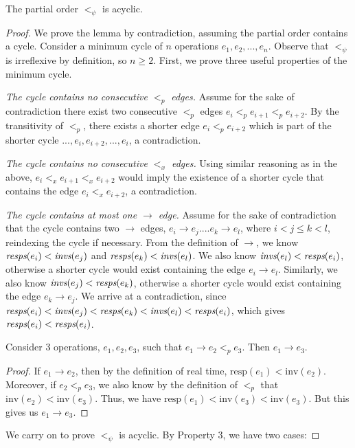 \begin{lem}
\label{lemmamain}
The partial order $<_\psi$ is acyclic.
\end{lem}
\begin{proof}
We prove the lemma by contradiction, assuming the partial order contains a cycle. Consider a minimum cycle of $n$ operations $e_1,e_2,...,e_n$. Observe that $<_\psi$ is irreflexive by definition, so $n \geq 2$. First, we prove three useful properties of the minimum cycle.

 \textit{The cycle contains no consecutive $<_p$ edges.} {Assume for the sake of contradiction there exist two consecutive $<_p$ edges $e_i <_p e_{i+1} <_p e_{i+2}$. By the transitivity of $<_p$, there exists a shorter edge $e_i <_p e_{i+2}$ which is part of the shorter cycle $..., e_i, e_{i+2}, ..., e_i$, a contradiction.}

 \textit{The cycle contains no consecutive $<_x$ edges.} {Using similar reasoning as in the above, $e_i <_x e_{i+1} <_x e_{i+2}$ would imply the existence of a shorter cycle that contains the edge $e_i <_x e_{i+2}$, a contradiction.}

 \textit{The cycle contains at most one $\rightarrow$ edge.} Assume for the sake of contradiction that the cycle contains two $\rightarrow$ edges, $e_i \rightarrow e_j .... e_k \rightarrow e_l$, where $i < j \leq k < l$, reindexing the cycle if necessary. From the definition of $\rightarrow$, we know $\operatorname*{\textit{resps}}(e_i) < \operatorname*{\textit{invs}}(e_j)$ and $\operatorname*{\textit{resps}}(e_k) < \operatorname*{\textit{invs}}(e_l)$. We also know $\operatorname*{\textit{invs}}(e_l) < \operatorname*{\textit{resps}}(e_i)$, otherwise a shorter cycle would exist containing the edge $e_i \rightarrow e_l$. Similarly, we also know $\operatorname*{\textit{invs}}(e_j) < \operatorname*{\textit{resps}}(e_k)$, otherwise a shorter cycle would exist containing the edge $e_k \rightarrow e_j$. We arrive at a contradiction, since $\operatorname*{\textit{resps}}(e_i) < \operatorname*{\textit{invs}}(e_j) < \operatorname*{\textit{resps}}(e_k) < \operatorname*{\textit{invs}}(e_l) < \operatorname*{\textit{resps}}(e_i)$, which gives $\operatorname*{\textit{resps}}(e_i) < \operatorname*{\textit{resps}}(e_i)$.

\begin{lem}
\label{lemma5}
Consider 3 operations, $e_1, e_2, e_3$, such that $e_1 \rightarrow e_2 <_p e_3$. Then $e_1 \rightarrow e_3$.
\end{lem}
\begin{proof}
    If $e_1 \rightarrow e_2$, then by the definition of real time, $\text{resp}(e_1) < \text{inv}(e_2)$. Moreover, if $e_2 <_p e_3$, we also know by the definition of $<_p$ that $\text{inv}(e_2) < \text{inv}(e_3)$. Thus, we have $\text{resp}(e_1) < \text{inv}(e_3) < \text{inv}(e_3)$. But this gives us $e_1 \rightarrow e_3$.
\end{proof}
We carry on to prove $<_\psi$ is acyclic. By Property 3, we have two cases:


\end{proof}
